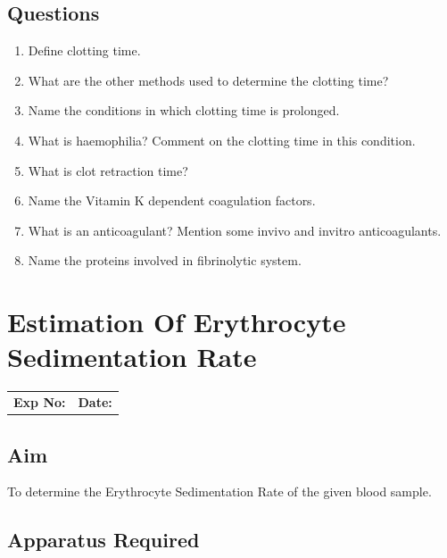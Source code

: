 \documentclass[a4paper,12pt,openany,oneside]{book}
\begin{document}
											\section*{Questions}
											\begin{enumerate}
												\item{Define clotting time.}
												\item{What are the other methods used to determine the clotting time?}
												\item{Name the conditions in which clotting time is prolonged.}
												\item{What is haemophilia? Comment on the clotting time in this condition.}
												\item{What is clot retraction time?}
												\item{Name the Vitamin K dependent coagulation factors.}
												\item{What is an anticoagulant? Mention some invivo and invitro anticoagulants.}
												\item{Name the proteins involved in fibrinolytic system.}
											\end{enumerate}

											\chapter*{\centering Estimation Of Erythrocyte Sedimentation Rate}
											\begin{tabular}{p{5in} p{1in}}
												\textbf{Exp No:}  & \textbf{Date:}\\
											\end{tabular}
											\section*{Aim}
											To determine the Erythrocyte Sedimentation Rate of the given blood sample.
											\section*{Apparatus Required}
\end{document}
